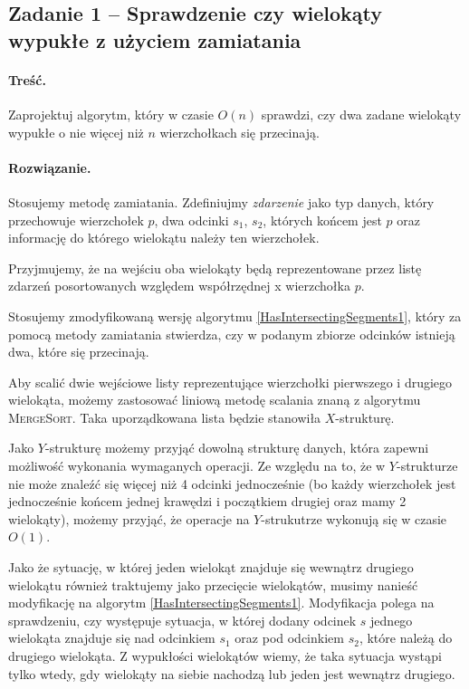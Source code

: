 
\subsection{Zadanie 1 -- Sprawdzenie czy wielokąty wypukłe z użyciem zamiatania} 
\paragraph{Treść.} Zaprojektuj algorytm, który w 
czasie $O(n)$ sprawdzi, czy dwa zadane wielokąty wypukłe o nie więcej
niż $n$ wierzchołkach się przecinają. 

\paragraph{Rozwiązanie.}
Stosujemy metodę zamiatania. Zdefiniujmy \textit{zdarzenie}
jako typ danych, który przechowuje wierzchołek $p$, dwa
odcinki $s_1$, $s_2$, których końcem jest $p$ oraz informację 
do którego wielokątu należy ten wierzchołek.

Przyjmujemy, że na wejściu oba wielokąty będą
reprezentowane przez listę zdarzeń posortowanych
względem współrzędnej x wierzchołka $p$. 

Stosujemy zmodyfikowaną wersję algorytmu \ref{HasIntersectingSegments1}, który za 
pomocą metody zamiatania stwierdza, czy w podanym
zbiorze odcinków istnieją dwa, które się przecinają.  

Aby scalić dwie wejściowe listy reprezentujące wierzchołki pierwszego
i drugiego wielokąta, możemy zastosować liniową metodę scalania
znaną z algorytmu \textsc{MergeSort}. Taka uporządkowana lista
będzie stanowiła $X$-strukturę.

Jako $Y$-strukturę możemy przyjąć dowolną strukturę danych, która
zapewni możliwość wykonania wymaganych operacji. Ze względu 
na to, że w $Y$-strukturze nie może znaleźć się więcej niż 
4 odcinki jednocześnie (bo każdy wierzchołek jest jednocześnie
końcem jednej krawędzi i początkiem drugiej oraz mamy 
2 wielokąty), możemy przyjąć, że operacje na $Y$-strukutrze wykonują się w czasie $O(1)$.

Jako że sytuację, w której jeden wielokąt znajduje się wewnątrz drugiego
wielokątu również traktujemy jako przecięcie wielokątów, musimy nanieść modyfikację
na algorytm \ref{HasIntersectingSegments1}. Modyfikacja polega na sprawdzeniu, 
czy występuje sytuacja, w której dodany odcinek $s$
jednego wielokąta znajduje się nad odcinkiem $s_1$ oraz pod odcinkiem $s_2$,
które należą do drugiego wielokąta. Z wypukłości wielokątów wiemy, że 
taka sytuacja wystąpi tylko wtedy, gdy wielokąty na siebie nachodzą lub
jeden jest wewnątrz drugiego.
 
